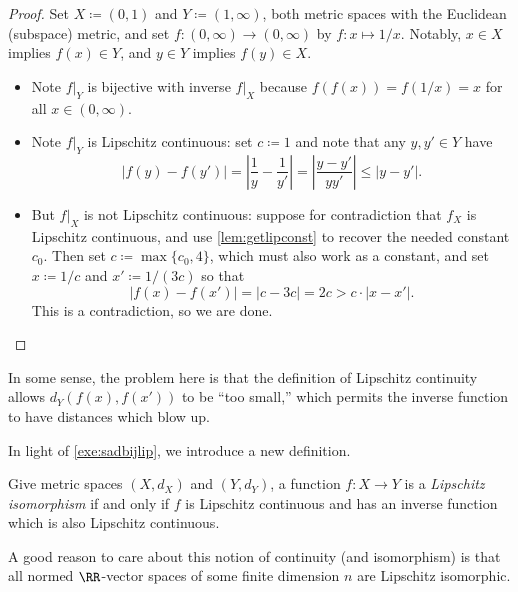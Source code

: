 \documentclass[../notes.tex]{subfiles}
\begin{document}
\begin{proof}
	Set $X\coloneqq(0,1)$ and $Y\coloneqq(1,\infty)$, both metric spaces with the Euclidean (subspace) metric, and set $f\colon(0,\infty)\to(0,\infty)$ by $f\colon x\mapsto1/x$. Notably, $x\in X$ implies $f(x)\in Y$, and $y\in Y$ implies $f(y)\in X$.
	\begin{itemize}
		\item Note $f|_Y$ is bijective with inverse $f|_X$ because $f(f(x))=f(1/x)=x$ for all $x\in(0,\infty)$.
		\item Note $f|_Y$ is Lipschitz continuous: set $c\coloneqq1$ and note that any $y,y'\in Y$ have
		\[|f(y)-f(y')|=\left|\frac1y-\frac1{y'}\right|=\left|\frac{y-y'}{yy'}\right|\le|y-y'|.\]
		\item But $f|_X$ is not Lipschitz continuous: suppose for contradiction that $f_X$ is Lipschitz continuous, and use \autoref{lem:getlipconst} to recover the needed constant $c_0$. Then set $c\coloneqq\max\{c_0,4\}$, which must also work as a constant, and set $x\coloneqq1/c$ and $x'\coloneqq1/(3c)$ so that
		\[|f(x)-f(x')|=\left|c-3c\right|=2c>c\cdot|x-x'|.\]
		This is a contradiction, so we are done.
		\qedhere
	\end{itemize}
\end{proof}
\begin{remark}[Nir]
	In some sense, the problem here is that the definition of Lipschitz continuity allows $d_Y(f(x),f(x'))$ to be ``too small,'' which permits the inverse function to have distances which blow up.
\end{remark}
In light of \autoref{exe:sadbijlip}, we introduce a new definition.
\begin{definition}
	Give metric spaces $(X,d_X)$ and $(Y,d_Y)$, a function $f\colon X\to Y$ is a \textit{Lipschitz isomorphism} if and only if $f$ is Lipschitz continuous and has an inverse function which is also Lipschitz continuous.
\end{definition}
\begin{remark}
	A good reason to care about this notion of continuity (and isomorphism) is that all normed $\RR$-vector spaces of some finite dimension $n$ are Lipschitz isomorphic.
\end{remark}
\end{document}
